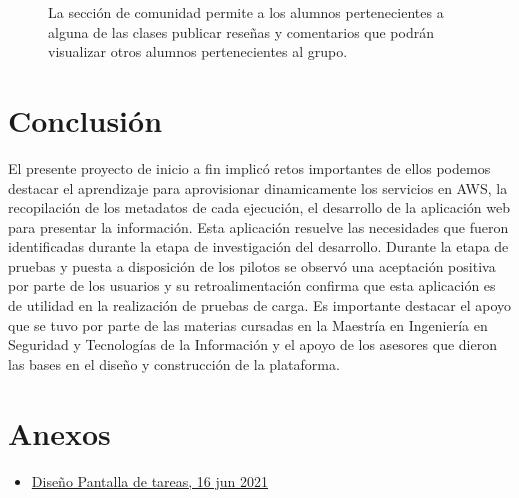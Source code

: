 \documentclass[10pt]{article}
\begin{document}
\begin{figure}[ht!]
\begin{minipage}[b]{0.49\linewidth}
        \caption{La sección de comunidad permite a los alumnos pertenecientes a alguna de las clases publicar reseñas y comentarios que podrán visualizar otros alumnos pertenecientes al grupo.}
    \end{minipage}
    \vspace{1cm}
\end{figure}

\newpage

\section{Conclusión}
\justify

El presente proyecto de inicio a fin implicó retos importantes de ellos podemos
destacar el aprendizaje para aprovisionar dinamicamente los servicios en AWS,
la recopilación de los metadatos de cada ejecución, el desarrollo de la
aplicación web para presentar la información. Esta aplicación resuelve las
necesidades que fueron identificadas durante la etapa de investigación del
desarrollo. Durante la etapa de pruebas y puesta a disposición de los pilotos
se observó una aceptación positiva por parte de los usuarios y su
retroalimentación confirma que esta aplicación es de utilidad en la realización
de pruebas de carga. Es importante destacar el apoyo que se tuvo por parte de
las materias cursadas en la Maestría en Ingeniería en Seguridad y Tecnologías
de la Información y el apoyo de los asesores que dieron las bases en el diseño
y construcción de la plataforma.

\nocite{*}




\section{Anexos}
\begin{itemize}
    \item \href{https://drive.google.com/file/d/1LhLRHHiWVeEFRqgwnUttkpgct9kEACTq/view?usp=sharing} {Diseño Pantalla de tareas,  16 jun 2021}

          \par\vspace{\baselineskip}

\end{itemize}
\end{document}

